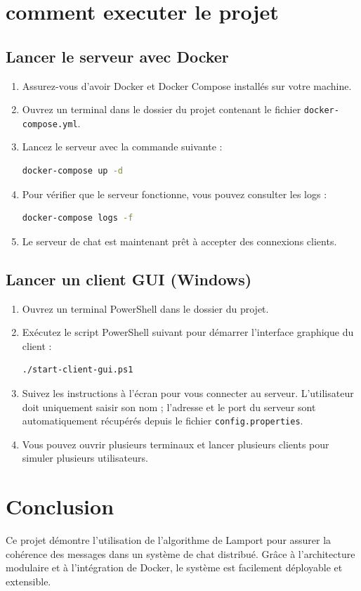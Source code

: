 \documentclass[a4paper,12pt]{article}
\begin{document}
\section{comment executer le projet}

\subsection{Lancer le serveur avec Docker}
\begin{enumerate}
    \item Assurez-vous d'avoir Docker et Docker Compose installés sur votre machine.
    \item Ouvrez un terminal dans le dossier du projet contenant le fichier \texttt{docker-compose.yml}.
    \item Lancez le serveur avec la commande suivante :
    \begin{lstlisting}[language=bash]
docker-compose up -d
    \end{lstlisting}
    \item Pour vérifier que le serveur fonctionne, vous pouvez consulter les logs :
    \begin{lstlisting}[language=bash]
docker-compose logs -f
    \end{lstlisting}
    \item Le serveur de chat est maintenant prêt à accepter des connexions clients.
\end{enumerate}

\subsection{Lancer un client GUI (Windows)}
\begin{enumerate}
    \item Ouvrez un terminal PowerShell dans le dossier du projet.
    \item Exécutez le script PowerShell suivant pour démarrer l'interface graphique du client :
    \begin{lstlisting}[language=bash]
./start-client-gui.ps1
    \end{lstlisting}
    \item Suivez les instructions à l'écran pour vous connecter au serveur. L'utilisateur doit uniquement saisir son nom ; l'adresse et le port du serveur sont automatiquement récupérés depuis le fichier \texttt{config.properties}.
    \item Vous pouvez ouvrir plusieurs terminaux et lancer plusieurs clients pour simuler plusieurs utilisateurs.
\end{enumerate}

\section{Conclusion}
Ce projet démontre l'utilisation de l'algorithme de Lamport pour assurer la cohérence des messages dans un système de chat distribué. Grâce à l'architecture modulaire et à l'intégration de Docker, le système est facilement déployable et extensible.
\end{document}
